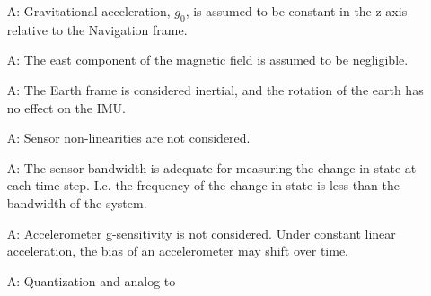 \documentclass[12pt]{article}
\begin{document}
\begin{itemize}
    \item[A\refstepcounter{assumpnum}\theassumpnum \label{a:gravity}:] Gravitational acceleration,
    $g_0$, is assumed to be constant in the z-axis relative to the Navigation frame.
    \item[A\refstepcounter{assumpnum}\theassumpnum \label{a:east_mag}:] The east component of the
    magnetic field is assumed to be negligible.
    \item[A\refstepcounter{assumpnum}\theassumpnum \label{a:rotation}:] The Earth frame is
    considered inertial, and the rotation of the earth has no effect on the IMU.
    \item[A\refstepcounter{assumpnum}\theassumpnum \label{a:nonlinear}:] Sensor non-linearities are
    not considered.
    \item[A\refstepcounter{assumpnum}\theassumpnum \label{a:bandwidth}:] The sensor bandwidth is
    adequate for measuring the change in state at each time step. I.e. the frequency of the change
    in state is less than the bandwidth of the system.
    \item[A\refstepcounter{assumpnum}\theassumpnum \label{a:gsense}:] Accelerometer g-sensitivity is
    not considered. Under constant linear acceleration, the bias of an accelerometer may shift over
    time.
    \item[A\refstepcounter{assumpnum}\theassumpnum \label{a:quant}:] Quantization and analog to

\end{itemize}
\end{document}
